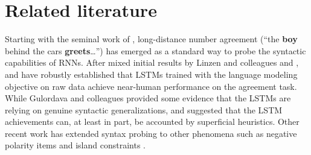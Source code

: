 
\section{Related literature}



Starting with the seminal work of ,
long-distance number agreement (``the \textbf{boy} behind the cars
\textbf{greets}\ldots'') has emerged as a standard way to probe the
syntactic capabilities of RNNs. After
mixed initial results by Linzen and colleagues and
,  and
 have robustly established that LSTMs
trained with the language modeling objective on raw data achieve
near-human performance on the agreement task. While Gulordava and
colleagues provided some evidence that the LSTMs are relying on
genuine syntactic generalizations,  and
 suggested that the LSTM achievements
can, at least in part, be accounted by superficial heuristics. Other
recent work has extended syntax probing to other phenomena such as
negative polarity items and island constraints
\cite{Chowdhury:Zamparelli:2018,jumelet2018language,marvin2018targeted,wilcox2018rnn}.

